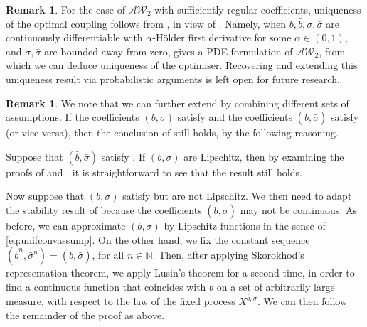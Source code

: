 \documentclass[oneside]{amsart}
\theoremstyle{definition}
\newtheorem{remark}[theorem]{Remark}
\newcommand{\AW}{\mathcal A\mathcal W}
\newcommand{\N}{\mathbb N}
\numberwithin{equation}{section}
\begin{document}
\begin{remark}\label{rem:sync-uniqueness}
	For the case of $\AW_2$ with sufficiently regular coefficients, uniqueness of the optimal coupling follows from \cite{BiTa19}, in view of . Namely, when $b, \bar b, \sigma, \bar \sigma$ are continuously differentiable with $\alpha$-H\"older first derivative for some $\alpha \in (0, 1)$, and $\sigma, \bar \sigma$ are bounded away from zero, \cite[Section 2.1]{BiTa19} gives a PDE formulation of $\AW_2$, from which we can deduce uniqueness of the optimiser. Recovering and extending this uniqueness result via probabilistic arguments is left open for future research.
\end{remark}

\begin{remark}
	We note that we can further extend  by combining different sets of assumptions. If the coefficients $(b, \sigma)$ satisfy  and the coefficients $(\bar b, \bar \sigma)$ satisfy  (or vice-versa), then the conclusion of  still holds, by the following reasoning.
	
	Suppose that $(\bar b, \bar \sigma)$ satisfy . If $(b, \sigma)$ are Lipschitz, then by examining the proofs of  and , it is straightforward to see that the result still holds.
	
	Now suppose that $(b, \sigma)$ satisfy  but are not Lipschitz. We then need to adapt the stability result of  because the coefficients $(\bar b, \bar \sigma)$ may not be continuous. As before, we can approximate $(b, \sigma)$ by Lipschitz functions in the sense of \eqref{eq:unifconvassump}. On the other hand, we fix the constant sequence $(\bar b^n, \bar \sigma^n) = (\bar b, \bar \sigma)$, for all $n \in \N$. Then, after applying Skorokhod's representation theorem, we apply Lusin's theorem for a second time, in order to find a continuous function that coincides with $\bar b$ on a set of arbitrarily large measure, with respect to the law of the fixed process $X^{\bar b, \bar \sigma}$. We can then follow the remainder of the proof as above.
\end{remark}
\end{document}
